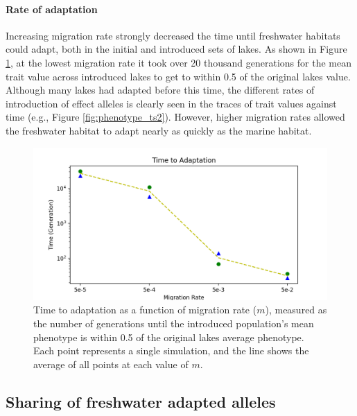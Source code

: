 \documentclass{article}
\begin{document}
\paragraph*{Rate of adaptation}
Increasing migration rate strongly decreased the time until freshwater habitats could adapt, both in the initial and introduced sets of lakes. As shown in Figure \ref{fig:TimeToAdaptation}, at the lowest migration rate it took over 20 thousand generations for the mean trait value across introduced lakes to get to within 0.5 of the original lakes value. Although many lakes had adapted before this time, the different rates of introduction of effect alleles is clearly seen in the traces of trait values against time (e.g., Figure \ref{fig:phenotype_ts2}). However, higher migration rates allowed the freshwater habitat to adapt nearly as quickly as the marine habitat.

\begin{figure}
	\begin{center}
        \includegraphics[width=0.8\linewidth]{matplotlibPlots/TimeToAdaptation}
        \caption{
            Time to adaptation as a function of migration rate ($m$),
            measured as the number of generations
            until the introduced population's mean phenotype is within 0.5 
            of the original lakes average phenotype. 
            Each point represents a single simulation, and
            the line shows the average of all points at each value of $m$.
        }
  		\label{fig:TimeToAdaptation}
	\end{center}
\end{figure}


\subsection*{Sharing of freshwater adapted alleles}

\end{document}
